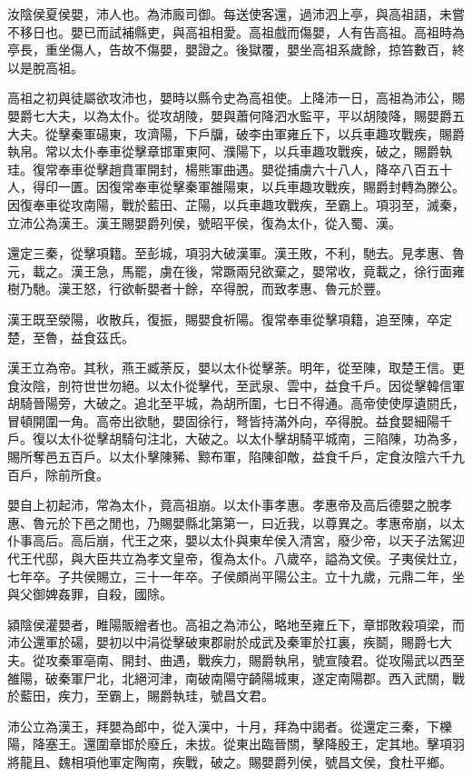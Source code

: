 汝陰侯夏侯嬰，沛人也。為沛廄司御。每送使客還，過沛泗上亭，與高祖語，未嘗不移日也。嬰已而試補縣吏，與高祖相愛。高祖戲而傷嬰，人有告高祖。高祖時為亭長，重坐傷人，告故不傷嬰，嬰證之。後獄覆，嬰坐高祖系歲餘，掠笞數百，終以是脫高祖。

高祖之初與徒屬欲攻沛也，嬰時以縣令史為高祖使。上降沛一日，高祖為沛公，賜嬰爵七大夫，以為太仆。從攻胡陵，嬰與蕭何降泗水監平，平以胡陵降，賜嬰爵五大夫。從擊秦軍碭東，攻濟陽，下戶牖，破李由軍雍丘下，以兵車趣攻戰疾，賜爵執帛。常以太仆奉車從擊章邯軍東阿、濮陽下，以兵車趣攻戰疾，破之，賜爵執珪。復常奉車從擊趙賁軍開封，楊熊軍曲遇。嬰從捕虜六十八人，降卒八百五十人，得印一匱。因復常奉車從擊秦軍雒陽東，以兵車趣攻戰疾，賜爵封轉為滕公。因復奉車從攻南陽，戰於藍田、芷陽，以兵車趣攻戰疾，至霸上。項羽至，滅秦，立沛公為漢王。漢王賜嬰爵列侯，號昭平侯，復為太仆，從入蜀、漢。

還定三秦，從擊項籍。至彭城，項羽大破漢軍。漢王敗，不利，馳去。見孝惠、魯元，載之。漢王急，馬罷，虜在後，常蹶兩兒欲棄之，嬰常收，竟載之，徐行面雍樹乃馳。漢王怒，行欲斬嬰者十餘，卒得脫，而致孝惠、魯元於豐。

漢王既至滎陽，收散兵，復振，賜嬰食祈陽。復常奉車從擊項籍，追至陳，卒定楚，至魯，益食茲氏。

漢王立為帝。其秋，燕王臧荼反，嬰以太仆從擊荼。明年，從至陳，取楚王信。更食汝陰，剖符世世勿絕。以太仆從擊代，至武泉、雲中，益食千戶。因從擊韓信軍胡騎晉陽旁，大破之。追北至平城，為胡所圍，七日不得通。高帝使使厚遺閼氏，冒頓開圍一角。高帝出欲馳，嬰固徐行，弩皆持滿外向，卒得脫。益食嬰細陽千戶。復以太仆從擊胡騎句注北，大破之。以太仆擊胡騎平城南，三陷陳，功為多，賜所奪邑五百戶。以太仆擊陳豨、黥布軍，陷陳卻敵，益食千戶，定食汝陰六千九百戶，除前所食。

嬰自上初起沛，常為太仆，竟高祖崩。以太仆事孝惠。孝惠帝及高后德嬰之脫孝惠、魯元於下邑之閒也，乃賜嬰縣北第第一，曰近我，以尊異之。孝惠帝崩，以太仆事高后。高后崩，代王之來，嬰以太仆與東牟侯入清宮，廢少帝，以天子法駕迎代王代邸，與大臣共立為孝文皇帝，復為太仆。八歲卒，謚為文侯。子夷侯灶立，七年卒。子共侯賜立，三十一年卒。子侯頗尚平陽公主。立十九歲，元鼎二年，坐與父御婢姦罪，自殺，國除。

潁陰侯灌嬰者，睢陽販繒者也。高祖之為沛公，略地至雍丘下，章邯敗殺項梁，而沛公還軍於碭，嬰初以中涓從擊破東郡尉於成武及秦軍於扛裏，疾鬬，賜爵七大夫。從攻秦軍亳南、開封、曲遇，戰疾力，賜爵執帛，號宣陵君。從攻陽武以西至雒陽，破秦軍尸北，北絕河津，南破南陽守齮陽城東，遂定南陽郡。西入武關，戰於藍田，疾力，至霸上，賜爵執珪，號昌文君。

沛公立為漢王，拜嬰為郎中，從入漢中，十月，拜為中謁者。從還定三秦，下櫟陽，降塞王。還圍章邯於廢丘，未拔。從東出臨晉關，擊降殷王，定其地。擊項羽將龍且、魏相項他軍定陶南，疾戰，破之。賜嬰爵列侯，號昌文侯，食杜平鄉。

